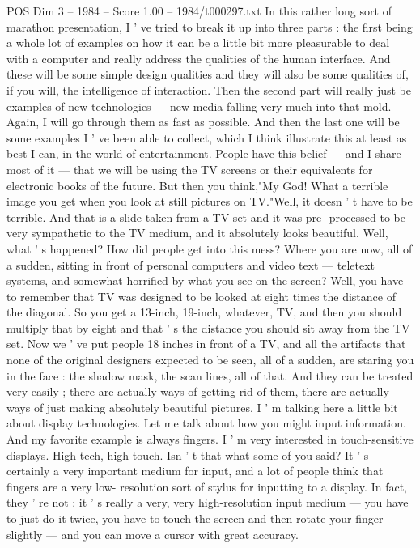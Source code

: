 \begin{textsample}{POS Dim 3 – 1984 – Score 1.00 – 1984/t000297.txt}  \label{ex:f3_pos_078}
In this rather long sort of marathon presentation, I ' ve tried to break it up into three parts : the first being a whole lot of examples on how it can be a little bit more pleasurable to deal with a computer and really address the qualities of the human interface.
And these will be some simple design qualities and they will also be some qualities of, if you will, the intelligence of interaction.
Then the second part will really just be examples of new technologies — new media falling very much into that mold.
Again, I will go through them as fast as possible.
And then the last one will be some examples I ' ve been able to collect, which I think illustrate this at least as best I can, in the world of entertainment.
People have this belief — and I share most of it — that we will be using the TV screens or their equivalents for electronic books of the future.
But then you think,"My God!
What a terrible image you get when you look at still pictures on TV."Well, it doesn ' t have to be terrible.
And that is a slide taken from a TV set and it was pre- processed to be very sympathetic to the TV medium, and it absolutely looks beautiful.
Well, what ' s happened?
How did people get into this mess?
Where you are now, all of a sudden, sitting in front of personal computers and video text — teletext systems, and somewhat horrified by what you see on the screen?
Well, you have to remember that TV was designed to be looked at eight times the distance of the diagonal.
So you get a 13-inch, 19-inch, whatever, TV, and then you should multiply that by eight and that ' s the distance you should sit away from the TV set.
Now we ' ve put people 18 inches in front of a TV, and all the artifacts that none of the original designers expected to be seen, all of a sudden, are staring you in the face : the shadow mask, the scan lines, all of that.
And they can be treated very easily ; there are actually ways of getting rid of them, there are actually ways of just making absolutely beautiful pictures.
I ' m talking here a little bit about display technologies.
Let me talk about how you might input information.
And my favorite example is always fingers.
I ' m very interested in touch-sensitive displays.
High-tech, high-touch.
Isn ' t that what some of you said?
It ' s certainly a very important medium for input, and a lot of people think that fingers are a very low- resolution sort of stylus for inputting to a display.
In fact, they ' re not : it ' s really a very, very high-resolution input medium — you have to just do it twice, you have to touch the screen and then rotate your finger slightly — and you can move a cursor with great accuracy.

\end{textsample}
